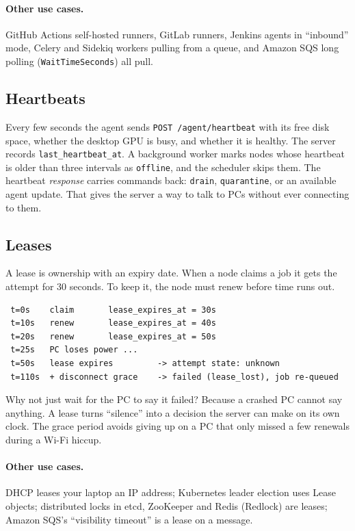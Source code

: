\paragraph{Other use cases.} GitHub Actions self-hosted runners, GitLab
runners, Jenkins agents in ``inbound'' mode, Celery and Sidekiq workers pulling
from a queue, and Amazon SQS long polling (\texttt{WaitTimeSeconds}) all pull.

\subsection{Heartbeats}

Every few seconds the agent sends \texttt{POST /agent/heartbeat} with its free
disk space, whether the desktop GPU is busy, and whether it is healthy. The
server records \texttt{last\_heartbeat\_at}. A background worker marks nodes
whose heartbeat is older than three intervals as \texttt{offline}, and the
scheduler skips them. The heartbeat \emph{response} carries commands back:
\texttt{drain}, \texttt{quarantine}, or an available agent update. That gives
the server a way to talk to PCs without ever connecting to them.

\subsection{Leases}

A lease is ownership with an expiry date. When a node claims a job it gets the
attempt for 30 seconds. To keep it, the node must renew before time runs out.

\begin{verbatim}
 t=0s    claim       lease_expires_at = 30s
 t=10s   renew       lease_expires_at = 40s
 t=20s   renew       lease_expires_at = 50s
 t=25s   PC loses power ...
 t=50s   lease expires         -> attempt state: unknown
 t=110s  + disconnect grace    -> failed (lease_lost), job re-queued
\end{verbatim}

Why not just wait for the PC to say it failed? Because a crashed PC cannot say
anything. A lease turns ``silence'' into a decision the server can make on its
own clock. The grace period avoids giving up on a PC that only missed a few
renewals during a Wi-Fi hiccup.

\paragraph{Other use cases.} DHCP leases your laptop an IP address; Kubernetes
leader election uses Lease objects; distributed locks in etcd, ZooKeeper and
Redis (Redlock) are leases; Amazon SQS's ``visibility timeout'' is a lease on a
message.


